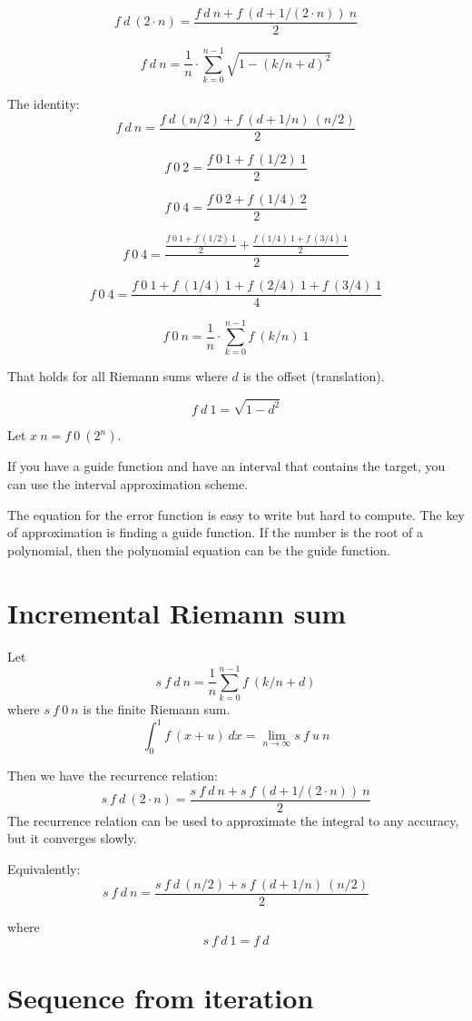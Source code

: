 \[
    f~d~(2 \cdot n) = \frac{f~d~n + f~(d + 1/(2\cdot n))~n}{2}
\]

\[
    f~d~n = \frac{1}{n} \cdot \sum_{k=0}^{n-1} \sqrt{1 - (k/n + d)^2}
\]

The identity:
\[
    f~d~n = \frac{f~d~(n/2) + f~(d + 1/n)~(n/2)}{2}
\]

\[
    f~0~2 = \frac{f~0~1 + f~(1/2)~1}{2}
\]

\[
    f~0~4 = \frac{f~0~2 + f~(1/4)~2}{2}
\]

\[
    f~0~4 = \frac{\frac{f~0~1 + f~(1/2)~1}{2} + \frac{f~(1/4)~1 + f~(3/4)~1}{2}}{2}
\]

\[
    f~0~4 = \frac{f~0~1 + f~(1/4)~1 + f~(2/4)~1 + f~(3/4)~1}{4}
\]

\[
    f~0~n = \frac{1}{n} \cdot \sum_{k=0}^{n-1} f~(k/n)~1
\]

That holds for all Riemann sums where \(d\) is the offset (translation).

\[
    f~d~1 = \sqrt{1 - d^2}
\]

Let \(x~n = f~0~(2^n)\).

If you have a guide function and have an interval that contains the target,
you can use the interval approximation scheme.

The equation for the error function is easy to write but hard to compute.
The key of approximation is finding a guide function.
If the number is the root of a polynomial,
then the polynomial equation can be the guide function.

\section{Incremental Riemann sum}

Let
\[
    s~f~d~n = \frac{1}{n} \sum_{k=0}^{n-1} f~(k/n + d)
\]
where \(s~f~0~n\) is the finite Riemann sum.
\[
    \int_0^1 f~(x+u) ~ dx = \lim_{n\to\infty} s~f~u~n
\]

Then we have the recurrence relation:
\[
    s~f~d~(2 \cdot n) = \frac{s~f~d~n + s~f~(d + 1/(2 \cdot n))~n}{2}
\]
The recurrence relation can be used to approximate the integral to any accuracy,
but it converges slowly.

Equivalently:
\[
    s~f~d~n = \frac{s~f~d~(n/2) + s~f~(d + 1/n)~(n/2)}{2}
\]

where
\[
    s~f~d~1 = f~d
\]

\section{Sequence from iteration}

